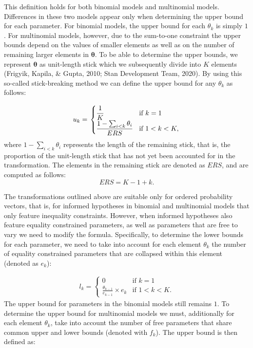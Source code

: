 \documentclass[
  english,
  man,floatsintext]{apa6}
\begin{document}
\begin{appendix}
This definition holds for both binomial models and multinomial models.
Differences in these two models appear only when determining the upper
bound for each parameter. For binomial models, the upper bound for each
\(\theta_k\) is simply \(1\). For multinomial models, however, due to
the sum-to-one constraint the upper bounds depend on the values of
smaller elements as well as on the number of remaining larger elements
in \(\boldsymbol{\theta}\). To be able to determine the upper bounds, we
represent \(\boldsymbol{\theta}\) as unit-length stick which we
subsequently divide into \(K\) elements (Frigyik, Kapila, \& Gupta,
2010; Stan Development Team, 2020). By using this so-called
stick-breaking method we can define the upper bound for any \(\theta_k\)
as follows:

\begin{align}
\label{Eq:upperBound}
u_k = \left.
\begin{cases}
\cfrac{1}{K} & \text{if } k = 1 \\
\cfrac{1 - \sum_{i < k} \theta_i}{ERS} & \text{if } 1 < k < K,
\end{cases}
\right.
\end{align} where \(1 - \sum_{i < k} \theta_i\) represents the length of
the remaining stick, that is, the proportion of the unit-length stick
that has not yet been accounted for in the transformation. The elements
in the remaining stick are denoted as \(ERS\), and are computed as
follows: \[ERS = K - 1 + k.\]

The transformations outlined above are suitable only for ordered
probability vectors, that is, for informed hypotheses in binomial and
multinomial models that only feature inequality constraints. However,
when informed hypotheses also feature equality constrained parameters,
as well as parameters that are free to vary we need to modify the
formula. Specifically, to determine the lower bounds for each parameter,
we need to take into account for each element \(\theta_k\) the number of
equality constrained parameters that are collapsed within this element
(denoted as \(e_k\)):

\begin{align}
l_k = \left.
\begin{cases}
0 & \text{if } k = 1 \\
\frac{\theta_{k - 1}}{e_{k-1}} \times e_k & \text{if } 1 < k < K.
\end{cases}
\right.
\end{align} The upper bound for parameters in the binomial models still
remains \(1\). To determine the upper bound for multinomial models we
must, additionally for each element \(\theta_k\), take into account the
number of free parameters that share common upper and lower bounds
(denoted with \(f_k\)). The upper bound is then defined as:


\end{appendix}
\end{document}
